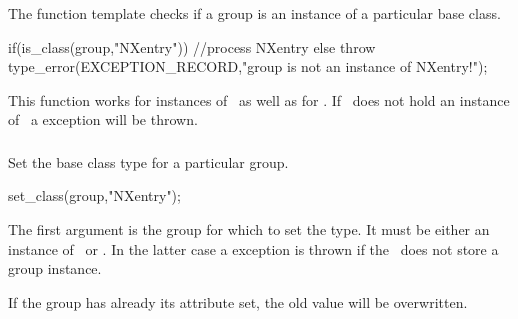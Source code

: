 \subsubsection{}

The  function template checks if a group is an instance of a
particular base class. 
\begin{cppcode}
if(is_class(group,"NXentry"))
    //process NXentry
else
    throw type_error(EXCEPTION_RECORD,"group is not an instance of NXentry!");
\end{cppcode}
This function works for instances of \nxgroup\ as well as for \nxobject.  If
\nxobject\ does not hold an instance of \nxgroup\ a  exception
will be thrown.

\subsubsection{}

Set the base class type for a particular group. 
\begin{cppcode}
set_class(group,"NXentry");
\end{cppcode}
The first argument is the group for which to set the type. It must be either an
instance of \nxgroup\ or \nxobject. In the latter case a 
exception is thrown if the \nxobject\ does not store a group instance.

If the group has already its  attribute set, the old value will be
overwritten.
